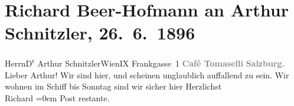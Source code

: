 

         \renewcommand{\erwaehnteOrte}{Orte: Café Tomaselli, Frankgasse, Hotel Schiff, IX., Alsergrund, Salzburg, Wien}
         \renewcommand{\erwaehnteWerke}{}
               \section[Richard Beer-Hofmann an Arthur Schnitzler, 26. 6. 1896]{ Richard Beer-Hofmann an Arthur Schnitzler, 26. 6. 1896}\nopagebreak{}\rehead{ }\begin{ledgroupsized}[t]{13cm}\normalsize\beginnumbering \toendnotes[C]{\smallbreak\pagebreak[2]} 
\pstart{}{\pb}Herrn\pend{}\pstart{}D\textsuperscript{r} Arthur Schnitzler\pend{}\pstart{}Wien\pend{}\pstart{}IX Frankgasse 1\pend{}{\bigskip}\pstart
           \noindent{}\centering{}{\pb}\textcolor{gray}{\textbf{Café Tomaselli}}\pend
           \pstart
           \noindent{}\centering{}\textcolor{gray}{\textbf{Salzburg.}}\pend
           \pstart{}Lieber Arthur!\pend\pstart
           Wir sind hier, und scheinen unglaublich auffallend zu sein. Wir wohnen im Schiff bis Sonntag sind wir sicher
               hier\pend
           \pstart
           Herzlichst{\\[\baselineskip]}\spacefill\mbox{Richard}\pend
           \leftskip=0em{}\pstart
           \noindent{}Post restante.\pend
           
         
         \endnumbering{}\end{ledgroupsized}  \newcommand{\dateiname}{L00554}\newcommand{\titel}{Richard Beer-Hofmann an Arthur Schnitzler, 26. 6. 1896}\newcommand{\editorInnen}{Martin Anton Müller und Gerd-Hermann Susen}
      